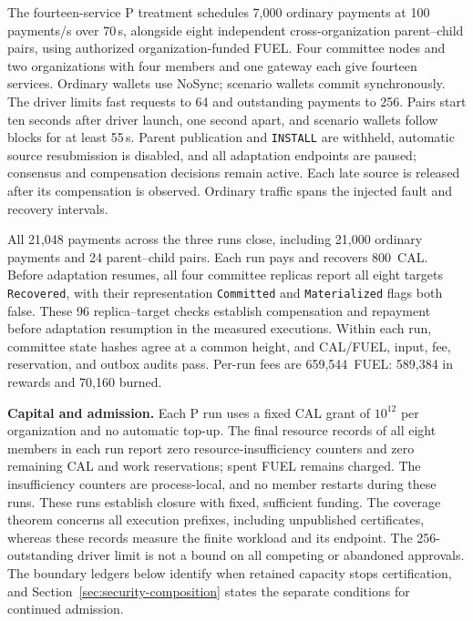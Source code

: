 The fourteen-service P treatment schedules 7,000 ordinary payments
at 100 payments/s over 70\,s, alongside eight independent
cross-organization parent--child pairs, using authorized
organization-funded FUEL. Four committee nodes and two organizations with four members and one gateway each give fourteen services. Ordinary wallets use NoSync; scenario wallets commit synchronously. The driver limits fast requests to 64 and outstanding payments to 256. Pairs start ten seconds after driver launch, one second apart, and scenario wallets follow blocks for at least 55\,s. Parent publication and \texttt{INSTALL}
are withheld, automatic source resubmission is disabled, and all
adaptation endpoints are paused; consensus and compensation
decisions remain active. Each late source is released after its
compensation is observed. Ordinary traffic spans the injected
fault and recovery intervals.

All 21,048 payments across the three runs close, including
21,000 ordinary payments and 24 parent--child pairs. Each run
pays and recovers 800~CAL. Before adaptation resumes, all four
committee replicas report all eight targets \texttt{Recovered},
with their representation \texttt{Committed} and
\texttt{Materialized} flags both false. These 96 replica--target
checks establish compensation and repayment before adaptation
resumption in the measured executions. Within each run,
committee state hashes agree at a common height, and CAL/FUEL,
input, fee, reservation, and outbox audits pass. Per-run fees are
659,544~FUEL: 589,384 in rewards and 70,160 burned.

\noindent\textbf{Capital and admission.}
Each P run uses a fixed CAL grant of $10^{12}$ per organization and no
automatic top-up. The final resource records of all eight members in each run
report zero resource-insufficiency counters and zero remaining CAL and work
reservations; spent FUEL remains charged. The insufficiency counters are
process-local, and no member restarts during these runs. These runs establish closure with
fixed, sufficient funding. The coverage theorem concerns all execution
prefixes, including unpublished certificates, whereas these records measure
the finite workload and its endpoint. The 256-outstanding driver limit is
not a bound on all competing or abandoned approvals. The boundary ledgers
below identify when retained capacity stops certification, and
Section~\ref{sec:security-composition} states the separate conditions for
continued admission.

